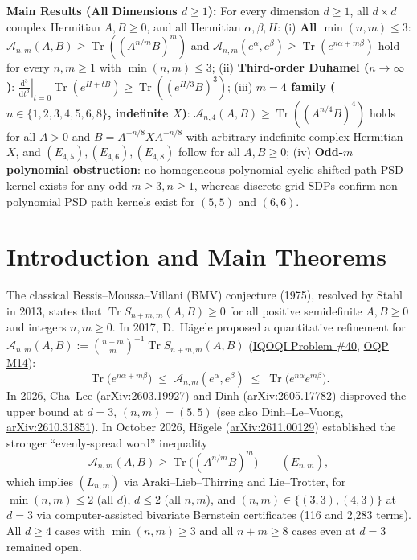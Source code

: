 \documentclass[11pt,a4paper]{article}
\theoremstyle{remark}
\newcommand{\Tr}{\operatorname{Tr}}
\newcommand{\takeaway}[2]{%
  \vspace{5pt}\noindent\colorbox{primary!8}{%
    \parbox{\dimexpr\linewidth-2\fboxsep\relax}{%
      \vspace{4pt}\textbf{\color{primary}#1:}\hspace{0.4em}#2\vspace{4pt}%
    }%
  }\vspace{5pt}%
}
\begin{document}
\takeaway{Main Results (All Dimensions $d \ge 1$)}{
For every dimension $d\ge 1$, all $d\times d$ complex Hermitian $A,B\ge 0$, and all Hermitian $\alpha,\beta,H$:
(i) \textbf{All $\min(n,m)\le 3$}: $\mathcal{A}_{n,m}(A,B)\ge\Tr((A^{n/m}B)^m)$ and $\mathcal{A}_{n,m}(e^\alpha,e^\beta)\ge\Tr(e^{n\alpha+m\beta})$ hold for every $n,m\ge 1$ with $\min(n,m)\le 3$;
(ii) \textbf{Third-order Duhamel ($n\to\infty$)}: $\left.\frac{\mathrm{d}^3}{\mathrm{d}t^3}\right|_{t=0}\Tr(e^{H+tB})\ge\Tr((e^{H/3}B)^3)$;
(iii) \textbf{$m=4$ family ($n\in\{1,2,3,4,5,6,8\}$, indefinite $X$)}: $\mathcal{A}_{n,4}(A,B)\ge\Tr((A^{n/4}B)^4)$ holds for all $A>0$ and $B=A^{-n/8}XA^{-n/8}$ with arbitrary indefinite complex Hermitian $X$, and $(E_{4,5}),(E_{4,6}),(E_{4,8})$ follow for all $A,B\ge 0$;
(iv) \textbf{Odd-$m$ polynomial obstruction}: no homogeneous polynomial cyclic-shifted path PSD kernel exists for any odd $m\ge 3, n\ge 1$, whereas discrete-grid SDPs confirm non-polynomial PSD path kernels exist for $(5,5)$ and $(6,6)$.}

\section{Introduction and Main Theorems}

The classical Bessis--Moussa--Villani (BMV) conjecture (1975), resolved by Stahl in 2013, states that $\Tr S_{n+m,m}(A,B)\ge 0$ for all positive semidefinite $A,B\ge 0$ and integers $n,m\ge 0$. In 2017, D.~H\"agele proposed a quantitative refinement for $\mathcal{A}_{n,m}(A,B):=\binom{n+m}{m}^{-1}\Tr S_{n+m,m}(A,B)$ (\href{https://oqp.iqoqi.oeaw.ac.at/open-quantum-problems}{IQOQI Problem \#40}, \href{https://openquantumproblems.com/p/M14}{OQP M14}):
\[
\Tr\!\big(e^{n\alpha+m\beta}\big)\;\le\;\mathcal{A}_{n,m}(e^\alpha,e^\beta)\;\le\;\Tr\!\big(e^{n\alpha}e^{m\beta}\big).
\]
In 2026, Cha--Lee (\href{https://arxiv.org/abs/2603.19927}{arXiv:2603.19927}) and Dinh (\href{https://arxiv.org/html/2605.17782v1}{arXiv:2605.17782}) disproved the upper bound at $d=3,\,(n,m)=(5,5)$ (see also Dinh--Le--Vuong, \href{https://arxiv.org/html/2610.31851v1}{arXiv:2610.31851}). In October 2026, H\"agele (\href{https://arxiv.org/html/2611.00129v1}{arXiv:2611.00129}) established the stronger ``evenly-spread word'' inequality
\begin{equation}\label{eq:Enm}
  \mathcal{A}_{n,m}(A,B) \ge \Tr\!\big((A^{n/m}B)^m\big) \qquad (E_{n,m}),
\end{equation}
which implies $(L_{n,m})$ via Araki--Lieb--Thirring and Lie--Trotter, for $\min(n,m)\le 2$ (all $d$), $d\le 2$ (all $n,m$), and $(n,m)\in\{(3,3),(4,3)\}$ at $d=3$ via computer-assisted bivariate Bernstein certificates (116 and 2,283 terms). All $d\ge 4$ cases with $\min(n,m)\ge 3$ and all $n+m\ge 8$ cases even at $d=3$ remained open.
\end{document}
